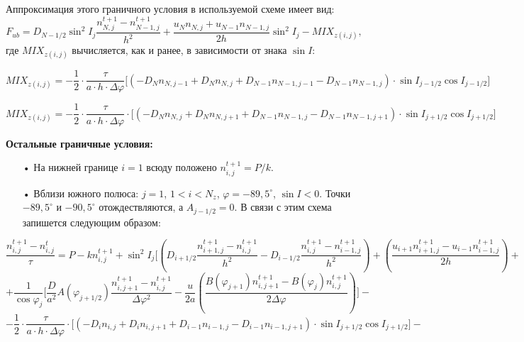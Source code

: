 \documentclass[2pt, a4paper, fleqn]{extarticle}
\let\geq\geqslant
\begin{document}
Аппроксимация этого граничного условия в используемой схеме имеет вид:
$$F_{ub} = D_{N-1/2}\sin^2I_j\dfrac{n_{N, j}^{t+1} - n_{N-1, j}^{t+1}}{h^2} + \dfrac{u_N n_{N, j}+u_{N-1}n_{N-1, j}}{2h}\sin^2I_j - MIX_{z(i, j)},$$
где $MIX_{z(i, j)}$ вычисляется, как и ранее, в зависимости от знака $\sin I$: 

\begin{center}
\fbox{При $\sin I \geq 0$:}
\end{center}

$$MIX_{z(i, j)} = -\dfrac{1}{2}\cdot\dfrac{\tau}{a\cdot h\cdot \Delta\varphi}\bigg[(-D_N n_{N, j-1} + D_N n_{N, j} + D_{N-1} n_{N-1, j-1} - D_{N-1} n_{N-1, j})\cdot \sin I_{j-1/2}\cos I_{j-1/2}\bigg]$$


\begin{center}
\end{center}

$$MIX_{z(i, j)} = -\dfrac{1}{2}\cdot\dfrac{\tau}{a\cdot h\cdot \Delta\varphi}\cdot\bigg[(-D_N n_{N, j} + D_N n_{N, j+1} + D_{N-1} n_{N-1, j} - D_{N-1} n_{N-1, j+1})\cdot \sin I_{j+1/2}\cos I_{j+1/2}\bigg]$$


\vspace{1cm}

{\bf Остальные граничные условия:}


\begin{itemize}
\item[•] На нижней границе $i=1$ всюду положено $n_{i, j}^{t+1} = P/k$.
\end{itemize}

\begin{itemize}
\item[•] Вблизи южного полюса: $j = 1$, $1<i<N_z$, $\varphi = -89{,}5^\circ$, $\sin I < 0$. Точки $-89{,}5^\circ$ и $-90{,}5^\circ$ отождествляются, а $A_{j-1/2} = 0$. В связи с этим схема запишется следующим образом: 
\end{itemize}
$$\dfrac{n_{i,j}^{t+1}-n_{i,j}^t}{\tau} = P - k n_{i, j}^{t+1} + \sin^2 I_j\bigg[\left(D_{i+1/2}\dfrac{n_{i+1, j}^{t+1}-n_{i,j}^{t+1}}{h^2}-D_{i-1/2}\dfrac{n_{i,j}^{t+1}-n_{i-1,j}^{t+1}}{h^2}\right)+\left(\dfrac{u_{i+1}n_{i+1,j}^{t+1}-u_{i-1}n_{i-1,j}^{t+1}}{2h}\right) + $$ $$+\dfrac{1}{\cos\varphi_j} \bigg[\dfrac{D}{a^2}A(\varphi_{j+1/2})\dfrac{n_{i, j+1}^{t+1}-n_{i,j}^{t+1}}{\Delta\varphi^2}-\dfrac{u}{2a}\left(\dfrac{B(\varphi_{j+1})n_{i,j+1}^{t+1}-B(\varphi_{j})n_{i,j}^{t+1}}{2\Delta\varphi}\right)\bigg] -$$ 
$$-\dfrac{1}{2}\cdot\dfrac{\tau}{a\cdot h\cdot \Delta\varphi}\cdot\bigg[(-D_i n_{i, j} + D_i n_{i, j+1} + D_{i-1} n_{i-1, j} - D_{i-1} n_{i-1, j+1})\cdot \sin I_{j+1/2}\cos I_{j+1/2}\bigg]-$$
\end{document}
